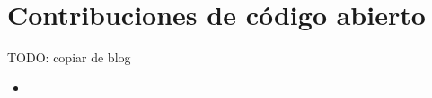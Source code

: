 \chapter{Contribuciones de código abierto}

TODO: copiar de blog

\begin{itemize}
    \item %

\end{itemize}
